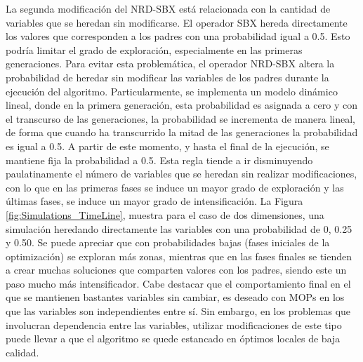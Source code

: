 La segunda modificación del NRD-SBX está relacionada con la cantidad de variables que se heredan sin modificarse.
%
El operador SBX hereda directamente los valores que corresponden a los padres con una probabilidad igual a 0.5.
%
Esto podría limitar el grado de exploración, 
especialmente en las primeras generaciones.
%
Para evitar esta problemática, el operador NRD-SBX altera la probabilidad de heredar sin modificar las variables de los padres durante la ejecución del algoritmo.
%
Particularmente, se implementa un modelo dinámico lineal, donde en la primera generación, esta probabilidad es asignada a cero y con el transcurso de las generaciones, la probabilidad se incrementa de manera lineal, de forma que cuando ha transcurrido la mitad de las generaciones la probabilidad es igual a 0.5.
%
A partir de este momento, y hasta el final de la ejecución, se mantiene fija la probabilidad a 0.5.
%
Esta regla tiende a ir disminuyendo paulatinamente el número de variables que se heredan sin realizar modificaciones, con lo que en las primeras fases se induce un mayor grado de exploración y las últimas fases, se induce un mayor grado de intensificación.
%
La Figura \ref{fig:Simulations_TimeLine}, muestra para el caso de dos dimensiones, una simulación heredando directamente las variables con una probabilidad de 0, 0.25 y 0.50.
%
Se puede apreciar que con probabilidades bajas (fases iniciales de la optimización) se exploran más zonas, mientras que en las fases finales se tienden a crear muchas soluciones que comparten valores con los padres, siendo este un paso mucho más intensificador.
%
Cabe destacar que el comportamiento final en el que se mantienen bastantes variables sin cambiar, es deseado con MOPs en los que las variables son independientes entre sí.
%
Sin embargo, en los problemas que involucran dependencia entre las variables, utilizar modificaciones de este tipo puede llevar a que el algoritmo se quede estancado en óptimos locales de baja calidad.
%


